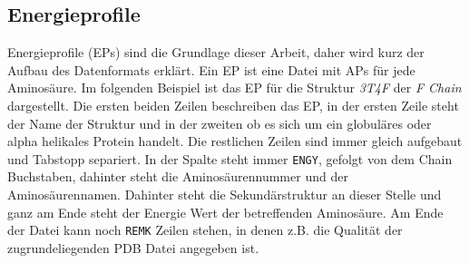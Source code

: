 \subsection{Energieprofile}
\label{sec:Energieprofil}
Energieprofile (EPs) sind die Grundlage dieser Arbeit, daher wird kurz der Aufbau des Datenformats erklärt. Ein \ac{EP} ist eine Datei mit \ac{APs} für jede Aminosäure. Im folgenden Beispiel ist das EP für die Struktur \emph{3T4F} der \emph{F Chain} dargestellt. Die ersten beiden Zeilen beschreiben das \ac{EP}, in der ersten Zeile steht der Name der Struktur und in der zweiten ob es sich um ein globuläres oder alpha helikales Protein handelt. Die restlichen Zeilen sind immer gleich aufgebaut und Tabstopp separiert. In der Spalte steht immer \texttt{ENGY}, gefolgt von dem Chain Buchstaben, dahinter steht die Aminosäurennummer und der Aminosäurennamen. Dahinter steht die Sekundärstruktur an dieser Stelle und ganz am Ende steht der Energie Wert der betreffenden Aminosäure. Am Ende der Datei kann noch \texttt{REMK} Zeilen stehen, in denen z.B. die Qualität der zugrundeliegenden \ac{PDB} Datei angegeben ist.

